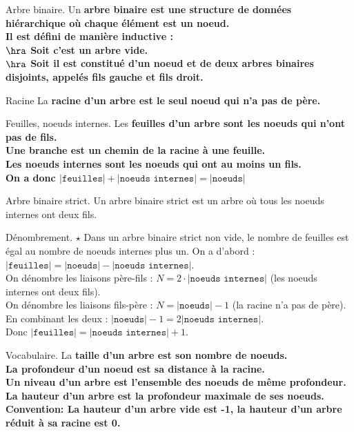 \documentclass[french, 11pt]{article}
\begin{document}
\begin{defi}{Arbre binaire.}{}
    Un \bf{arbre binaire} est une structure de données hiérarchique où chaque élément est un \bf{noeud}.\\
    Il est défini de manière inductive :\\
    $\hra$ Soit c'est un arbre vide.\\
    $\hra$ Soit il est constitué d'un noeud et de deux arbres binaires disjoints, appelés \bf{fils gauche} et \bf{fils droit}.
\end{defi}

\begin{defi}{Racine}{}
    La \bf{racine} d'un arbre est le seul noeud qui n'a pas de père.
\end{defi}

\begin{defi}{Feuilles, noeuds internes.}{}
    Les \bf{feuilles} d'un arbre sont les noeuds qui n'ont pas de fils.\\
    Une \bf{branche} est un chemin de la racine à une feuille.\\
    Les \bf{noeuds internes} sont les noeuds qui ont au moins un fils.\\
    On a donc $|\texttt{feuilles}| + |\texttt{noeuds internes}| = |\texttt{noeuds}|$
\end{defi}

\begin{defi}{Arbre binaire strict.}{}
    Un arbre binaire strict est un arbre où tous les noeuds internes ont deux fils.
\end{defi}

\begin{prop}{Dénombrement. $\star$}{}
    Dans un arbre binaire strict non vide, le nombre de feuilles est égal au nombre de noeuds internes plus un.
    \tcblower
    On a d'abord : $|\texttt{feuilles}|=|\texttt{noeuds}|-|\texttt{noeuds internes}|$.\\
    On dénombre les liaisons père-fils : $N=2\cdot|\texttt{noeuds internes}|$ (les noeuds internes ont deux fils).\\
    On dénombre les liaisons fils-père : $N=|\texttt{noeuds}|-1$ (la racine n'a pas de père).\\
    En combinant les deux : $|\texttt{noeuds}|-1=2|\texttt{noeuds internes}|$.\\
    Donc $|\texttt{feuilles}|=|\texttt{noeuds internes}|+1$.
\end{prop}

\begin{defi}{Vocabulaire.}{}
    La \bf{taille} d'un arbre est son nombre de noeuds.\\
    La \bf{profondeur} d'un noeud est sa distance à la racine.\\
    Un \bf{niveau} d'un arbre est l'ensemble des noeuds de même profondeur.\\
    La \bf{hauteur} d'un arbre est la profondeur maximale de ses noeuds.\n
    \bf{Convention:} La hauteur d'un arbre vide est -1, la hauteur d'un arbre réduit à sa racine est 0.
\end{defi}
\end{document}

